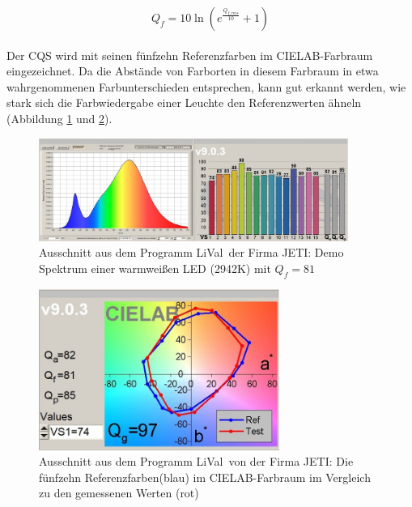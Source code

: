 \begin{equation}\label{gl_cqs3}
		Q_{f} = 10 \ln(e^{\frac{Q_{f,rms}}{10}}+1) 
\end{equation}\\
Der CQS wird mit seinen fünfzehn Referenzfarben im CIELAB-Farbraum eingezeichnet. Da die Abstände von Farborten in diesem Farbraum in etwa wahrgenommenen Farbunterschieden entsprechen, kann gut erkannt werden, wie stark sich die Farbwiedergabe einer Leuchte den Referenzwerten ähneln (Abbildung \ref{b_cqs2a} und \ref{b_cqs2b}).\\

\begin{figure}[H]     %
\centering
\includegraphics[width=0.9\textwidth]{bilder/cqs2a} 
\caption {Ausschnitt aus dem Programm \glqq LiVal\grqq\ der Firma JETI: Demo Spektrum einer warmweißen LED (2942K) mit $Q_{f} = 81$}\label{b_cqs2a}
\end{figure}

\begin{figure}[H]     %
\centering
\includegraphics[width=0.7\textwidth]{bilder/cqs2b} 
\caption {Ausschnitt aus dem Programm \glqq LiVal\grqq\ von der Firma JETI: Die fünfzehn Referenzfarben(blau) im CIELAB-Farbraum im Vergleich zu den gemessenen Werten (rot)}\label{b_cqs2b}
\end{figure}


